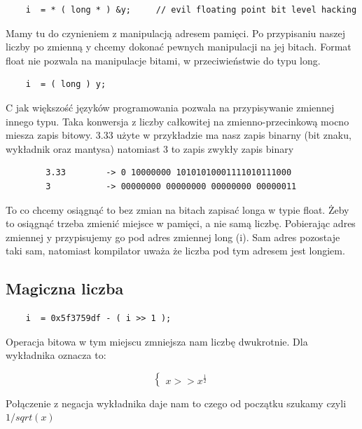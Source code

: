 \documentclass[12pt]{article}
\begin{document}
\begin{lstlisting}
    i  = * ( long * ) &y;     // evil floating point bit level hacking
\end{lstlisting}

Mamy tu do czynieniem z manipulacją adresem pamięci. Po przypisaniu naszej liczby po zmienną y chcemy dokonać pewnych manipulacji na jej bitach. Format float nie pozwala na manipulacje bitami, w przeciwieństwie do typu long.

\begin{lstlisting}
    i  = ( long ) y;     
\end{lstlisting}

C jak większość języków programowania pozwala na przypisywanie zmiennej innego typu. Taka konwersja z liczby całkowitej na zmienno-przecinkową mocno miesza zapis bitowy. 3.33 użyte w przykładzie ma nasz zapis binarny (bit znaku, wykładnik oraz mantysa) natomiast 3 to zapis zwykły zapis binary

\begin{lstlisting}
        3.33        -> 0 10000000 10101010001111010111000
        3           -> 00000000 00000000 00000000 00000011
\end{lstlisting}


\noindent To co chcemy osiągnąć to bez zmian na bitach zapisać longa w typie float. Żeby to osiągnąć trzeba zmienić miejsce w pamięci, a nie samą liczbę. Pobierając adres zmiennej y przypisujemy go pod adres zmiennej long (i). Sam adres pozostaje taki sam, natomiast kompilator uważa że liczba pod tym adresem jest longiem. 

\subsection{Magiczna liczba}

\begin{lstlisting}
    i  = 0x5f3759df - ( i >> 1 );   
\end{lstlisting}

Operacja bitowa w tym miejscu zmniejsza nam liczbę dwukrotnie. Dla wykładnika oznacza to:

$$ \begin{cases}
x >> x^{\frac{1}{2}}
\end{cases} $$

\noindent Połączenie z negacja wykładnika daje nam to czego od początku szukamy czyli $1/sqrt(x)$
\newline
\newline
\end{document}
